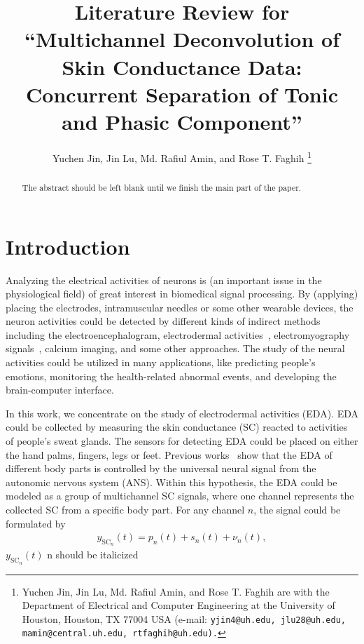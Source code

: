 \documentclass[10pt,conference]{ieeeconf}
\providecommand{\rm}{\mathrm}
\begin{document}
\title{Literature Review for ``Multichannel Deconvolution of Skin Conductance Data: Concurrent Separation of Tonic and Phasic Component''}


\author{Yuchen Jin, Jin Lu, Md. Rafiul Amin, and Rose T. Faghih \thanks{Yuchen Jin, Jin Lu, Md. Rafiul Amin, and Rose T. Faghih are with the Department of Electrical and Computer Engineering at the University of Houston, Houston, TX 77004 USA (e-mail: \tt\small  yjin4@uh.edu, jlu28@uh.edu, mamin@central.uh.edu, rtfaghih@uh.edu).} 
}

\maketitle

\begin{abstract}

The abstract should be left blank until we finish the main part of the paper.

\end{abstract}

\section{Introduction} \label{introduction}

Analyzing the electrical activities of neurons is (an important issue in the physiological field) {\color{red}of great interest in biomedical signal processing}. By (applying) {\color{red}placing} the electrodes, intramuscular needles or some other wearable devices, the neuron activities could be detected by different kinds of indirect methods including the electroencephalogram, electrodermal activities~\cite{savazzi2019estimation,jain2016compressed,amin2019robust}, electromyography signals~\cite{biagetti2016homomorphic}, calcium imaging, and some other approaches. The study of the neural activities could be utilized in many applications, like predicting people's emotions, monitoring the health-related abnormal events, and developing the brain-computer interface.

In this work, we concentrate on the study of electrodermal activities (EDA). EDA could be collected by measuring the skin conductance (SC) reacted to activities of people's sweat glands. The sensors for detecting EDA could be placed on either the hand palms, fingers, legs or feet. Previous works~\cite{fowles1981publication,amin2019robust} show that the EDA of different body parts is controlled by the universal neural signal from the autonomic nervous system (ANS). Within this hypothesis, the EDA could be modeled as a group of multichannel SC signals, where one channel represents the collected SC from a specific body part. For any channel $n$, the signal could be formulated by
\begin{align}
  y_{\rm{SC}_n}(t) = p_n(t) + s_n(t) + \nu_n(t),
\end{align}
%
{\color{red} $y_{\rm{SC}_n}(t)$  n should be italicized}
\end{document}
